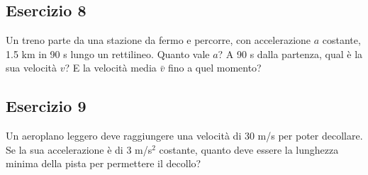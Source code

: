 \documentclass[12pt,a4paper]{book}
\begin{document}
\subsection*{Esercizio 8}
Un treno parte da una stazione da fermo e percorre, con accelerazione $a$ costante, 1.5 km in 90 s lungo un rettilineo. Quanto vale $a$? A 90 s dalla partenza, qual è la sua velocità $v$? E la velocità media $\bar{v}$ fino a quel momento?


\subsection*{Esercizio 9}
Un aeroplano leggero deve raggiungere una velocità di 30 m/s per poter decollare. Se la sua accelerazione è di $3 $ m/s$^2$ costante, quanto deve essere la lunghezza minima della pista per permettere il decollo?
\end{document}
